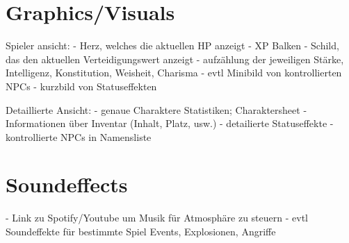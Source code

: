 \documentclass[11pt]{article}
\begin{document}
    \section{Graphics/Visuals}
    Spieler ansicht:
    - Herz, welches die aktuellen HP anzeigt
    - XP Balken
    - Schild, das den aktuellen Verteidigungswert anzeigt
    - aufzählung der jeweiligen Stärke, Intelligenz, Konstitution, Weisheit, Charisma
    - evtl Minibild von kontrollierten NPCs
    - kurzbild von Statuseffekten

    Detaillierte Ansicht:
    - genaue Charaktere Statistiken; Charaktersheet
    - Informationen über Inventar (Inhalt, Platz, usw.)
    - detailierte Statuseffekte
    - kontrollierte NPCs in Namensliste

    \section{Soundeffects}
    - Link zu Spotify/Youtube um Musik für Atmosphäre zu steuern
    - evtl Soundeffekte für bestimmte Spiel Events, Explosionen, Angriffe
\end{document}
